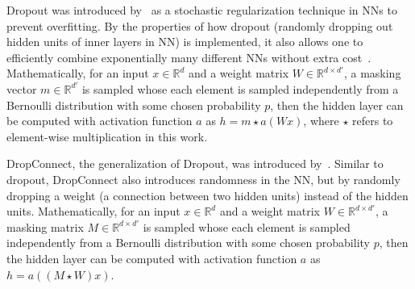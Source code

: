     Dropout was introduced by~\cite{DropoutOG} as a stochastic regularization technique in NNs to prevent overfitting. By the properties of how dropout (randomly dropping out hidden units of inner layers in NN) is implemented, it also allows one to efficiently combine exponentially many different NNs without extra cost~\cite{DropoutOG}. Mathematically, for an input $x \in \mathbb{R}^d$ and a weight matrix $W\in \mathbb{R}^{d \times d'}$, a masking vector $m \in \mathbb{R}^{d'}$ is sampled whose each element is sampled independently from a Bernoulli distribution with some chosen probability $p$, then the hidden layer can be computed with activation function $a$ as $h = m \star a(Wx)$, where $\star$ refers to element-wise multiplication in this work.
    \newline

    DropConnect, the generalization of Dropout, was introduced by~\cite{DropConnectOG}. Similar to dropout, DropConnect also introduces randomness in the NN, but by randomly dropping a weight (a connection between two hidden units) instead of the hidden units. Mathematically, for an input $x \in \mathbb{R}^d$ and a weight matrix $W\in \mathbb{R}^{d \times d'}$, a masking matrix $M \in \mathbb{R}^{d \times d'}$ is sampled whose each element is sampled independently from a Bernoulli distribution with some chosen probability $p$, then the hidden layer can be computed with activation function $a$ as $h = a((M \star W) x)$.
    \newline

